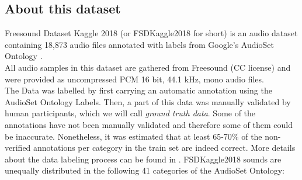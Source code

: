 \documentclass{article} %
\begin{document}
	\subsection{About this dataset}
		Freesound Dataset Kaggle 2018 (or FSDKaggle2018 for short) is an audio dataset containing 18,873 audio files annotated with labels from Google's AudioSet Ontology \cite{cite9}.\\
		\newline
		All audio samples in this dataset are gathered from Freesound \cite{cite10} (CC license) and were provided as uncompressed PCM 16 bit, 44.1 kHz, mono audio files.\\
		\newline
		The Data was labelled by first carrying an automatic annotation using the AudioSet Ontology Labels. Then, a part of this data was manually validated by human participants, which we will call \emph{ground truth data}. Some of the annotations have not been manually validated and therefore some of them could be inaccurate. Nonetheless, it was estimated that at least 65-70\% of the non-verified annotations per category in the train set are indeed correct. More details about the data labeling process can be found in \cite{cite11}.
		\newline
		FSDKaggle2018 sounds are unequally distributed in the following 41 categories of the AudioSet Ontology:\\
\end{document}
